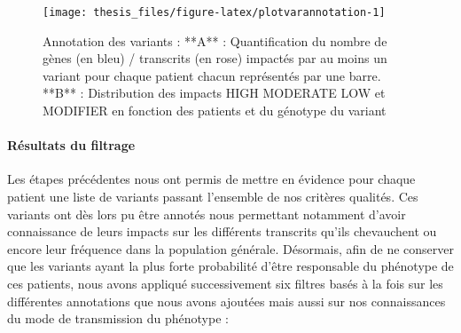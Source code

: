 \documentclass[12pt,twoside]{reedthesis}
\theoremstyle{definition}
\theoremstyle{definition}
\theoremstyle{remark}
\begin{document}
  \newpage
  
  \begin{figure}
  
  {\centering \texttt{[image: thesis\_files/figure-latex/plotvarannotation-1]} 
  
  }
  
  \caption[Annotation des variants]{Annotation des variants : **A** : Quantification du nombre de gènes (en bleu) / transcrits (en rose) impactés par au moins un variant pour chaque patient chacun représentés par une barre. **B** : Distribution des impacts HIGH MODERATE LOW et MODIFIER en fonction des patients et du génotype du variant}\label{fig:plotvarannotation}
  \end{figure}
  
  \newpage
  
  \hypertarget{filterdescription}{\paragraph{Résultats du
  filtrage}\label{filterdescription}}
  
  Les étapes précédentes nous ont permis de mettre en évidence pour chaque
  patient une liste de variants passant l'ensemble de nos critères
  qualités. Ces variants ont dès lors pu être annotés nous permettant
  notamment d'avoir connaissance de leurs impacts sur les différents
  transcrits qu'ils chevauchent ou encore leur fréquence dans la
  population générale. Désormais, afin de ne conserver que les variants
  ayant la plus forte probabilité d'être responsable du phénotype de ces
  patients, nous avons appliqué successivement six filtres basés à la fois
  sur les différentes annotations que nous avons ajoutées mais aussi sur
  nos connaissances du mode de transmission du phénotype :
  
\end{document}
